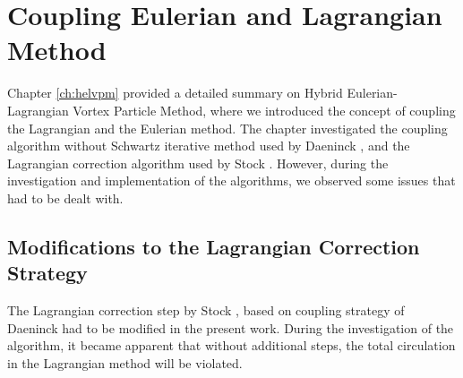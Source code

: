 \chapter{Coupling Eulerian and Lagrangian Method}
\label{ch:coupling}


Chapter \ref{ch:helvpm} provided a detailed summary on Hybrid Eulerian-Lagrangian Vortex Particle Method, where we introduced the concept of coupling the Lagrangian and the Eulerian method. The chapter investigated the coupling algorithm without Schwartz iterative method used by Daeninck \cite{Daeninck2006}, and the Lagrangian correction algorithm used by Stock \cite{Stock2010a}. However, during the investigation and implementation of the algorithms, we observed some issues that had to be dealt with.

\section{Modifications to the Lagrangian Correction Strategy}
\label{seec:coupling-mthlcs}
The Lagrangian correction step by Stock \cite{Stock2010a}, based on coupling strategy of Daeninck \cite{Daeninck2006} had to be modified in the present work. During the investigation of the algorithm, it became apparent that without additional steps, the total circulation in the Lagrangian method will be violated.

